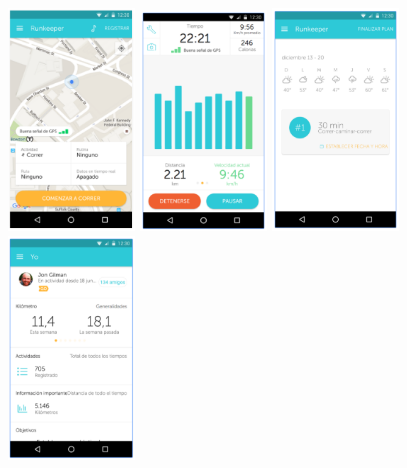 \documentclass[a4paper, 11pt]{article}
\begin{document}
                  \begin{figure}[H]
                      \centering
                      \includegraphics[width=0.3\textwidth]{runkeeper1}
                      \includegraphics[width=0.3\textwidth]{runkeeper2}
                      \includegraphics[width=0.3\textwidth]{runkeeper3}
                      \includegraphics[width=0.3\textwidth]{runkeeper4}

\end{figure}
\end{document}
